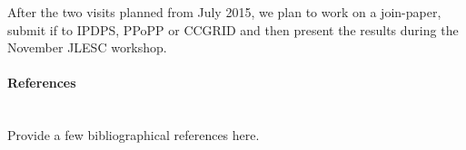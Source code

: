 \begin{refsection}
After the two visits planned from July 2015, we plan to work on a join-paper, submit if to IPDPS, PPoPP or CCGRID and then present the results during the November JLESC workshop.

\paragraph{References}~\\

Provide a few bibliographical references here.

\printbibliography[heading=none,notkeyword=own]

\end{refsection}
